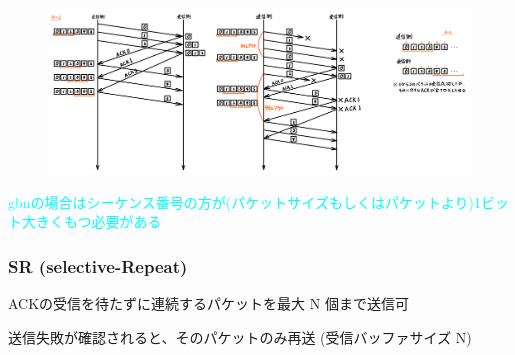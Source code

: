 \begin{figure}[h]

  \centering
  \includegraphics[width=0.9\linewidth]{image/cumulative_ack.png}
\end{figure}

\textcolor{cyan}{gbnの場合はシーケンス番号の方が(パケットサイズもしくはパケットより)1ビット大きくもつ必要がある}

\newpage
\subsubsection{SR (selective-Repeat)}

ACKの受信を待たずに連続するパケットを最大 N 個まで送信可

送信失敗が確認されると、そのパケットのみ再送  (受信バッファサイズ N)

